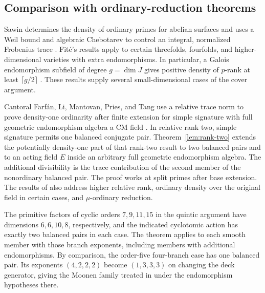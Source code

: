 \subsection{Comparison with ordinary-reduction theorems}

Sawin determines the density of ordinary primes for abelian surfaces and
uses a Weil bound and algebraic Chebotarev to control an integral,
normalized Frobenius trace \cite[Theorem~1 and Corollary~2]{sawin}.
Fit\'e's results apply to certain threefolds, fourfolds, and higher-dimensional
varieties with extra endomorphisms. In particular, a Galois endomorphism
subfield of degree \(g=\dim J\) gives positive density of \(p\)-rank
at least \(\lceil g/2\rceil\) \cite[Theorems~1--4 and Corollary~5]{fite}.
These results supply several small-dimensional cases of the cover
argument.

Cantoral Farf\'an, Li, Mantovan, Pries, and Tang use a relative trace norm
to prove density-one ordinarity after finite extension for simple
signature with full geometric endomorphism algebra a CM field
\cite[Assumptions~2.1 and~2.5, Proposition~3.12, and Theorem~4.18]{cantoral}.
In relative rank two, simple signature permits one balanced conjugate
pair. Theorem~\ref{lem:rank-two} extends the potentially density-one part
of that rank-two result to two balanced pairs and to an acting field
\(E\) inside an arbitrary full geometric endomorphism algebra. The
additional divisibility is the trace contribution of the second
member of the nonordinary balanced pair. The proof works at split
primes after base extension. The results of \cite[Theorems~4.18--4.19]{cantoral}
also address higher relative rank, ordinary density over the original
field in certain cases, and \(\mu\)-ordinary reduction.

The primitive factors of cyclic orders \(7,9,11,15\) in the quintic
argument have dimensions \(6,6,10,8\), respectively, and the indicated
cyclotomic action has exactly two balanced pairs in each case. The
theorem applies to each smooth member with those branch exponents,
including members with additional endomorphisms. By comparison, the
order-five four-branch case has one balanced pair. Its exponents
\((4,2,2,2)\) become \((1,3,3,3)\) on changing the deck generator,
giving the Moonen family treated in
\cite[Corollary~5.1 and \S5.2]{cantoral} under the endomorphism hypotheses
there.
